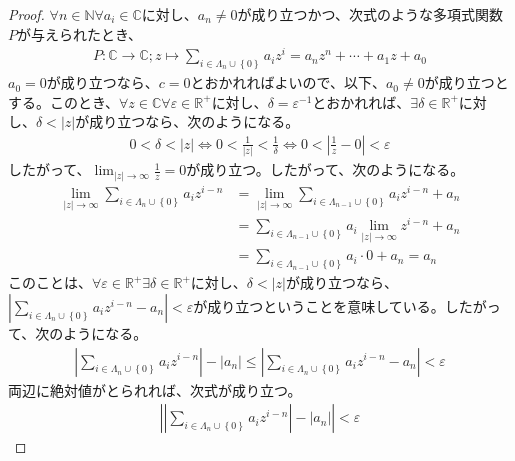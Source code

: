 \documentclass[dvipdfmx]{jsarticle}
\begin{document}
\begin{proof}
$\forall n \in \mathbb{N}\forall a_{i} \in \mathbb{C}$に対し、$a_{n} \neq 0$が成り立つかつ、次式のような多項式関数$P$が与えられたとき、
\begin{align*}
P:\mathbb{C} \rightarrow \mathbb{C};z \mapsto \sum_{i \in \varLambda_{n} \cup \left\{ 0 \right\}} {a_{i}z^{i}} = a_{n}z^{n} + \cdots + a_{1}z + a_{0}
\end{align*}
$a_{0} = 0$が成り立つなら、$c = 0$とおかれればよいので、以下、$a_{0} \neq 0$が成り立つとする。このとき、$\forall z \in \mathbb{C}\forall\varepsilon \in \mathbb{R}^{+}$に対し、$\delta = \varepsilon^{- 1}$とおかれれば、$\exists\delta \in \mathbb{R}^{+}$に対し、$\delta < |z|$が成り立つなら、次のようになる。
\begin{align*}
0 < \delta < |z| \Leftrightarrow 0 < \frac{1}{|z|} < \frac{1}{\delta} \Leftrightarrow 0 < \left| \frac{1}{z} - 0 \right| < \varepsilon
\end{align*}
したがって、$\lim_{|z| \rightarrow \infty}\frac{1}{z} = 0$が成り立つ。したがって、次のようになる。
\begin{align*}
\lim_{|z| \rightarrow \infty}{\sum_{i \in \varLambda_{n} \cup \left\{ 0 \right\}} {a_{i}z^{i - n}}} &= \lim_{|z| \rightarrow \infty}{\sum_{i \in \varLambda_{n - 1} \cup \left\{ 0 \right\}} {a_{i}z^{i - n}}} + a_{n}\\
&= \sum_{i \in \varLambda_{n - 1} \cup \left\{ 0 \right\}} {a_{i}\lim_{|z| \rightarrow \infty}z^{i - n}} + a_{n}\\
&= \sum_{i \in \varLambda_{n - 1} \cup \left\{ 0 \right\}} {a_{i} \cdot 0} + a_{n} = a_{n}
\end{align*}
このことは、$\forall\varepsilon \in \mathbb{R}^{+}\exists\delta \in \mathbb{R}^{+}$に対し、$\delta < |z|$が成り立つなら、$\left| \sum_{i \in \varLambda_{n} \cup \left\{ 0 \right\}} {a_{i}z^{i - n}} - a_{n} \right| < \varepsilon$が成り立つということを意味している。したがって、次のようになる。
\begin{align*}
\left| \sum_{i \in \varLambda_{n} \cup \left\{ 0 \right\}} {a_{i}z^{i - n}} \right| - \left| a_{n} \right| \leq \left| \sum_{i \in \varLambda_{n} \cup \left\{ 0 \right\}} {a_{i}z^{i - n}} - a_{n} \right| < \varepsilon
\end{align*}
両辺に絶対値がとられれば、次式が成り立つ。
\begin{align*}
\left| \left| \sum_{i \in \varLambda_{n} \cup \left\{ 0 \right\}} {a_{i}z^{i - n}} \right| - \left| a_{n} \right| \right| < \varepsilon
\end{align*}

\end{proof}
\end{document}

